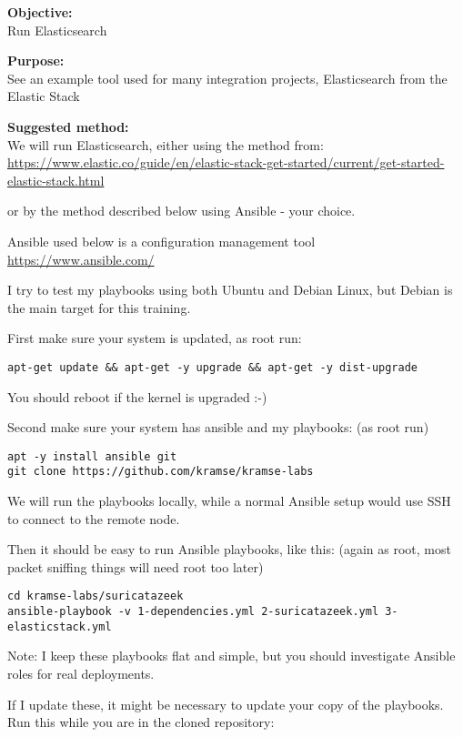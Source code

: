 \documentclass[a4paper,11pt,notitlepage]{report}
\begin{document}
{\bf Objective:}\\
Run Elasticsearch

{\bf Purpose:}\\
See an example tool used for many integration projects, Elasticsearch from the Elastic Stack

{\bf Suggested method:}\\
We will run Elasticsearch, either using the method from:\\{\footnotesize
\url{https://www.elastic.co/guide/en/elastic-stack-get-started/current/get-started-elastic-stack.html}}

or by the method described below using Ansible - your choice.

Ansible used below is a configuration management tool \url{https://www.ansible.com/}

I try to test my playbooks using both Ubuntu and Debian Linux, but Debian is the main target for this training.

First make sure your system is updated, as root run:

\begin{verbatim}
apt-get update && apt-get -y upgrade && apt-get -y dist-upgrade
\end{verbatim}

You should reboot if the kernel is upgraded :-)

Second make sure your system has ansible and my playbooks: (as root run)
\begin{verbatim}
apt -y install ansible git
git clone https://github.com/kramse/kramse-labs
\end{verbatim}

We will run the playbooks locally, while a normal Ansible setup would use SSH to connect to the remote node.

Then it should be easy to run Ansible playbooks, like this: (again as root, most packet sniffing things will need root too later)

\begin{verbatim}
cd kramse-labs/suricatazeek
ansible-playbook -v 1-dependencies.yml 2-suricatazeek.yml 3-elasticstack.yml
\end{verbatim}

Note: I keep these playbooks flat and simple, but you should investigate Ansible roles for real deployments.

If I update these, it might be necessary to update your copy of the playbooks. Run this while you are in the cloned repository:
\end{document}
